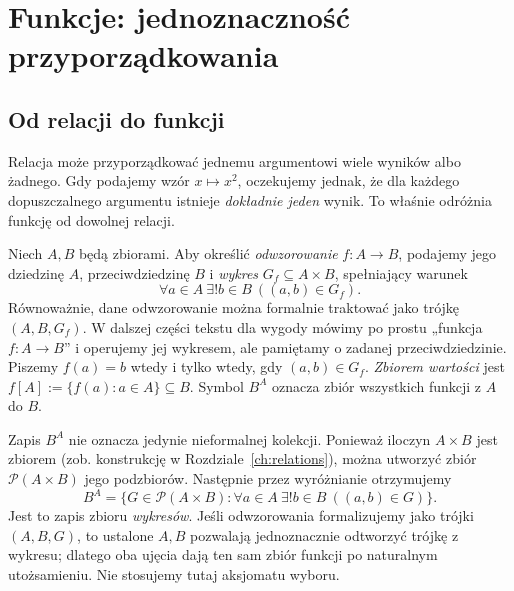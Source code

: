 \chapter{Funkcje: jednoznaczność przyporządkowania}\label{ch:functions}
\section{Od relacji do funkcji}
Relacja może przyporządkować jednemu argumentowi wiele wyników albo żadnego. Gdy podajemy wzór $x\mapsto x^2$, oczekujemy jednak, że dla każdego dopuszczalnego argumentu istnieje \emph{dokładnie jeden} wynik. To właśnie odróżnia funkcję od dowolnej relacji.
\begin{definicja}\label{def:function}
Niech $A,B$ będą zbiorami. Aby określić \emph{odwzorowanie}
$f:A\to B$, podajemy jego dziedzinę $A$, przeciwdziedzinę $B$
i \emph{wykres} $G_f\subseteq A\times B$, spełniający warunek
\[
\forall a\in A\ \exists!b\in B\ ((a,b)\in G_f).
\]
Równoważnie, dane odwzorowanie można formalnie traktować jako
trójkę $(A,B,G_f)$. W dalszej części tekstu dla wygody
mówimy po prostu „funkcja $f:A\to B$” i operujemy jej wykresem,
ale pamiętamy o zadanej przeciwdziedzinie.
Piszemy $f(a)=b$ wtedy i tylko wtedy, gdy $(a,b)\in G_f$.
\emph{Zbiorem wartości} jest $f[A]:=\{f(a):a\in A\}\subseteq B$.
Symbol $B^A$ oznacza zbiór wszystkich funkcji z $A$ do $B$.
\end{definicja}

\begin{uwaga}\label{rem:function-set-zf-xliv}
Zapis $B^A$ nie oznacza jedynie nieformalnej kolekcji. Ponieważ
iloczyn $A\times B$ jest zbiorem (zob. konstrukcję w
Rozdziale~\ref{ch:relations}), można utworzyć zbiór
$\mathcal P(A\times B)$ jego podzbiorów. Następnie przez wyróżnianie
otrzymujemy
\[
 B^A=\{G\in\mathcal P(A\times B):
 \forall a\in A\ \exists!b\in B\ ((a,b)\in G)\}.
\]
Jest to zapis zbioru \emph{wykresów}. Jeśli odwzorowania formalizujemy
jako trójki $(A,B,G)$, to ustalone $A,B$ pozwalają jednoznacznie
odtworzyć trójkę z wykresu; dlatego oba ujęcia dają ten sam zbiór funkcji
po naturalnym utożsamieniu. Nie stosujemy tutaj aksjomatu wyboru.
\end{uwaga}

